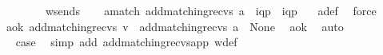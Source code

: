 \begin{isabellebody}
\ \ \ \ \ \ \ \ w{\isacharunderscore}{\kern0pt}sends{\isacharunderscore}{\kern0pt}{}{\isacharparenright}{\kern0pt}\isanewline
\ \ \isamarkupfalse%
\ a{\isacharunderscore}{\kern0pt}match{\isacharcolon}{\kern0pt}\ {\isachardoublequoteopen}{\isacharparenleft}{\kern0pt}add{\isacharunderscore}{\kern0pt}matching{\isacharunderscore}{\kern0pt}recvs\ {\isacharbrackleft}{\kern0pt}a{\isacharbrackright}{\kern0pt}{\isacharparenright}{\kern0pt}\ {\isacharequal}{\kern0pt}\ {\isacharparenleft}{\kern0pt}{\isacharbrackleft}{\kern0pt}{\isacharbang}{\kern0pt}{\isasymlangle}{\isacharparenleft}{\kern0pt}i\isactrlbsup q{\isasymrightarrow}p\isactrlesup {\isacharparenright}{\kern0pt}{\isasymrangle}{\isacharbrackright}{\kern0pt}\ {\isasymsqdot}\ {\isacharbrackleft}{\kern0pt}{\isacharquery}{\kern0pt}{\isasymlangle}{\isacharparenleft}{\kern0pt}i\isactrlbsup q{\isasymrightarrow}p\isactrlesup {\isacharparenright}{\kern0pt}{\isasymrangle}{\isacharbrackright}{\kern0pt}{\isacharparenright}{\kern0pt}{\isachardoublequoteclose}\ \ \isamarkupfalse%
\ a{\isacharunderscore}{\kern0pt}def\ \isamarkupfalse%
\ force\isanewline
\ \ \isamarkupfalse%
\ \isamarkupfalse%
\ a{\isacharunderscore}{\kern0pt}ok{\isacharcolon}{\kern0pt}\ {\isachardoublequoteopen}{\isacharparenleft}{\kern0pt}{\isacharparenleft}{\kern0pt}add{\isacharunderscore}{\kern0pt}matching{\isacharunderscore}{\kern0pt}recvs\ v{\isacharparenright}{\kern0pt}\ {\isasymsqdot}\ {\isacharparenleft}{\kern0pt}add{\isacharunderscore}{\kern0pt}matching{\isacharunderscore}{\kern0pt}recvs\ {\isacharbrackleft}{\kern0pt}a{\isacharbrackright}{\kern0pt}{\isacharparenright}{\kern0pt}{\isacharparenright}{\kern0pt}\ {\isasymin}\ {\isasymT}\isactrlbsub None\isactrlesub {\isachardoublequoteclose}\ \isamarkupfalse%
\ a{\isacharunderscore}{\kern0pt}ok{}\ \isamarkupfalse%
\ auto\isanewline
\ \ \ \ \ \ \isanewline
\ \ \isamarkupfalse%
\ \isamarkupfalse%
\ {\isacharquery}{\kern0pt}case\ \isamarkupfalse%
\ {\isacharparenleft}{\kern0pt}simp\ add{\isacharcolon}{\kern0pt}\ add{\isacharunderscore}{\kern0pt}matching{\isacharunderscore}{\kern0pt}recvs{\isacharunderscore}{\kern0pt}app\ w{\isacharunderscore}{\kern0pt}def{\isacharparenright}{\kern0pt}\ \isanewline
{}\isamarkupfalse%
%
\endisatagproof
{\isafoldproof}%
%
\isadelimproof
%
\endisadelimproof
%
\isadelimdocument
%
\endisadelimdocument
%
\isatagdocument
%
\end{isabellebody}
